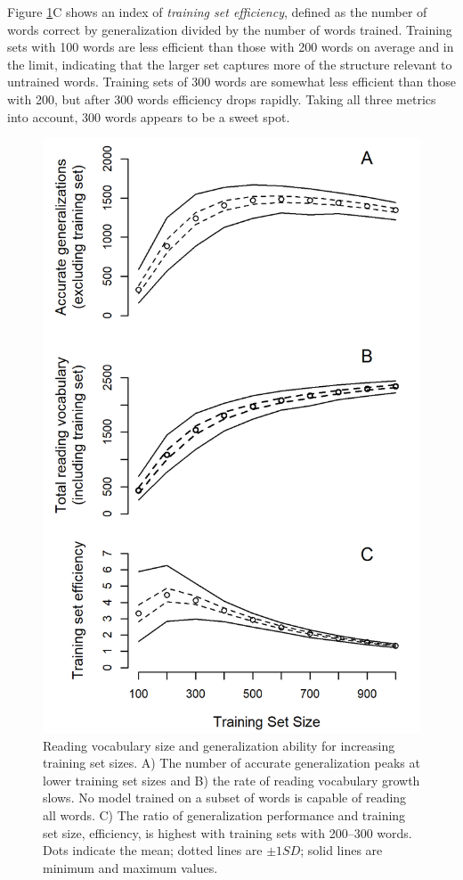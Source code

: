 \documentclass[10pt,letterpaper]{article}
\begin{document}
Figure \ref{gen_by_setsize}C shows an index of \emph{training set efficiency}, defined as the number of words correct by generalization divided by the number of words trained. Training sets with 100 words are less efficient than those with 200 words on average and in the limit, indicating that the larger set captures more of the structure relevant to untrained words. Training sets of 300 words are somewhat less efficient than those with 200, but after 300 words efficiency drops rapidly. Taking all three metrics into account, 300 words appears to be a sweet spot.

\begin{figure}[t]
	\includegraphics[width=0.9\columnwidth]{figures/generalization_by_setsize.png}

	\caption{Reading vocabulary size and generalization ability for increasing training set sizes. A) The number of accurate generalization peaks at lower training set sizes and B) the rate of reading vocabulary growth slows. No model trained on a subset of words is capable of reading all words. C) The ratio of generalization performance and training set size, efficiency, is highest with training sets with 200--300 words. Dots indicate the mean; dotted lines are $\pm 1 SD$; solid lines are minimum and maximum values.}
	
	\label{gen_by_setsize}
\end{figure}
\end{document}
